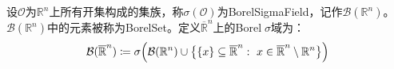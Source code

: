 \begin{definition}
	设$\mathcal{O}$为$\mathbb{R}^{n}$上所有开集构成的集族，称$\sigma(\mathcal{O})$为\gls{BorelSigmaField}，记作$\mathcal{B}(\mathbb{R}^{n})$。$\mathcal{B}(\mathbb{R}^{n})$中的元素被称为\gls{BorelSet}。定义$\overline{\mathbb{R}}^n$上的Borel$\;\sigma$域为：
	\begin{equation*}
		\mathcal{B}(\overline{\mathbb{R}}^n)\coloneq\sigma\Bigl(\mathcal{B}(\mathbb{R}^n)\cup\bigl\{\{x\}\subseteq\overline{\mathbb{R}}^n:\ x\in\overline{\mathbb{R}}^n\setminus\mathbb{R}^n\bigr\}\Bigr)
	\end{equation*}
\end{definition}
